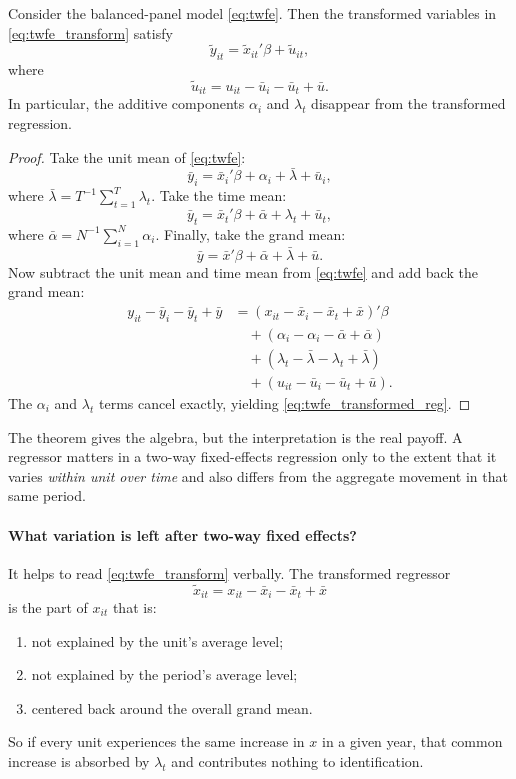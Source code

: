 \begin{thmN}
Consider the balanced-panel model \eqref{eq:twfe}. Then the transformed variables in \eqref{eq:twfe_transform} satisfy
\begin{equation}
\tilde{y}_{it} = \tilde{x}_{it}'\beta + \tilde{u}_{it},
\label{eq:twfe_transformed_reg}
\end{equation}
where
\[
\tilde{u}_{it}=u_{it}-\bar{u}_i-\bar{u}_t+\bar{u}.
\]
In particular, the additive components $\alpha_i$ and $\lambda_t$ disappear from the transformed regression.
\label{thm:double_demean}
\end{thmN}

\begin{proof}
Take the unit mean of \eqref{eq:twfe}:
\[
\bar{y}_i = \bar{x}_i'\beta + \alpha_i + \bar{\lambda} + \bar{u}_i,
\]
where $\bar{\lambda}=T^{-1}\sum_{t=1}^T \lambda_t$. Take the time mean:
\[
\bar{y}_t = \bar{x}_t'\beta + \bar{\alpha} + \lambda_t + \bar{u}_t,
\]
where $\bar{\alpha}=N^{-1}\sum_{i=1}^N \alpha_i$. Finally, take the grand mean:
\[
\bar{y} = \bar{x}'\beta + \bar{\alpha} + \bar{\lambda} + \bar{u}.
\]
Now subtract the unit mean and time mean from \eqref{eq:twfe} and add back the grand mean:
\begin{align*}
y_{it}-\bar{y}_i-\bar{y}_t+\bar{y}
&=
(x_{it}-\bar{x}_i-\bar{x}_t+\bar{x})'\beta \\
&\quad +(\alpha_i-\alpha_i-\bar{\alpha}+\bar{\alpha}) \\
&\quad +(\lambda_t-\bar{\lambda}-\lambda_t+\bar{\lambda}) \\
&\quad +(u_{it}-\bar{u}_i-\bar{u}_t+\bar{u}).
\end{align*}
The $\alpha_i$ and $\lambda_t$ terms cancel exactly, yielding \eqref{eq:twfe_transformed_reg}.
\end{proof}

The theorem gives the algebra, but the interpretation is the real payoff. A regressor matters in a two-way fixed-effects regression only to the extent that it varies \emph{within unit over time} and also differs from the aggregate movement in that same period.

\paragraph{What variation is left after two-way fixed effects?}
It helps to read \eqref{eq:twfe_transform} verbally. The transformed regressor
\[
\tilde{x}_{it}=x_{it}-\bar{x}_i-\bar{x}_t+\bar{x}
\]
is the part of $x_{it}$ that is:
\begin{enumerate}
\item not explained by the unit's average level;
\item not explained by the period's average level;
\item centered back around the overall grand mean.
\end{enumerate}
So if every unit experiences the same increase in $x$ in a given year, that common increase is absorbed by $\lambda_t$ and contributes nothing to identification.

